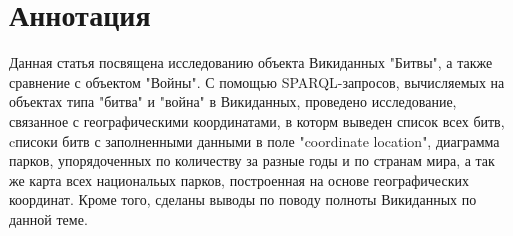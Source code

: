 \section{Аннотация}

Данная статья посвящена исследованию объекта Викиданных "Битвы", а также сравнение с объектом "Войны". С помощью SPARQL-запросов, вычисляемых на объектах типа "битва" и "война" в Викиданных, проведено исследование, связанное с географическими координатами, в которм выведен список всех битв, cписоки битв  с заполненными данными в поле "coordinate location", диаграмма парков, упорядоченных по количеству за разные годы и по странам мира, а так же карта всех национальых парков, построенная на основе географических координат. Кроме того, сделаны выводы по поводу полноты Викиданных по данной теме.